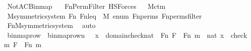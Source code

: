 %
\begin{isabellebody}%
%
%
\isadelimtheory
%
\endisadelimtheory
%
\isatagtheory
{}\isamarkupfalse%
\ NotAC{\isacharunderscore}{\kern0pt}Binmap\isanewline
\ \ \ Fn{\isacharunderscore}{\kern0pt}Perm{\isacharunderscore}{\kern0pt}Filter\ HS{\isacharunderscore}{\kern0pt}Forces\isanewline
{}%
\endisatagtheory
{\isafoldtheory}%
%
\isadelimtheory
\ \isanewline
%
\endisadelimtheory
\isanewline
{}\isamarkupfalse%
\ M{\isacharunderscore}{\kern0pt}ctm\ \ \isanewline
\isanewline
{}\isamarkupfalse%
\ M{\isacharunderscore}{\kern0pt}symmetric{\isacharunderscore}{\kern0pt}system\ {\isachardoublequoteopen}Fn{\isachardoublequoteclose}\ {\isachardoublequoteopen}Fn{\isacharunderscore}{\kern0pt}leq{\isachardoublequoteclose}\ {\isachardoublequoteopen}{}{\isachardoublequoteclose}\ {\isachardoublequoteopen}M{\isachardoublequoteclose}\ {\isachardoublequoteopen}enum{\isachardoublequoteclose}\ {\isachardoublequoteopen}Fn{\isacharunderscore}{\kern0pt}perms{\isachardoublequoteclose}\ {\isachardoublequoteopen}Fn{\isacharunderscore}{\kern0pt}perms{\isacharunderscore}{\kern0pt}filter{\isachardoublequoteclose}\isanewline
%
\isadelimproof
\ \ %
\endisadelimproof
%
\isatagproof
{}\isamarkupfalse%
\ Fn{\isacharunderscore}{\kern0pt}M{\isacharunderscore}{\kern0pt}symmetric{\isacharunderscore}{\kern0pt}system\ \isamarkupfalse%
\ auto%
\endisatagproof
{\isafoldproof}%
%
\isadelimproof
\isanewline
%
\endisadelimproof
\isanewline
{}\isamarkupfalse%
\ binmap{\isacharunderscore}{\kern0pt}row{\isacharprime}{\kern0pt}\ \ {\isachardoublequoteopen}binmap{\isacharunderscore}{\kern0pt}row{\isacharprime}{\kern0pt}{\isacharparenleft}{\kern0pt}n{\isacharparenright}{\kern0pt}\ {\isasymequiv}\ {\isacharbraceleft}{\kern0pt}\ x\ {\isasymin}\ domain{\isacharparenleft}{\kern0pt}check{\isacharparenleft}{\kern0pt}nat{\isacharparenright}{\kern0pt}{\isacharparenright}{\kern0pt}\ {\isasymtimes}\ Fn{\isachardot}{\kern0pt}\ {\isasymexists}F\ {\isasymin}\ Fn{\isachardot}{\kern0pt}\ {\isasymexists}m\ {\isasymin}\ nat{\isachardot}{\kern0pt}\ x\ {\isacharequal}{\kern0pt}\ {\isacharless}{\kern0pt}check{\isacharparenleft}{\kern0pt}m{\isacharparenright}{\kern0pt}{\isacharcomma}{\kern0pt}\ F{\isachargreater}{\kern0pt}\ {\isasymand}\ F{\isacharbackquote}{\kern0pt}{\isacharless}{\kern0pt}n{\isacharcomma}{\kern0pt}\ m{\isachargreater}{\kern0pt}\ {\isacharequal}{\kern0pt}\ {}\ {\isacharbraceright}{\kern0pt}{\isachardoublequoteclose}\ \isanewline

\end{isabellebody}
